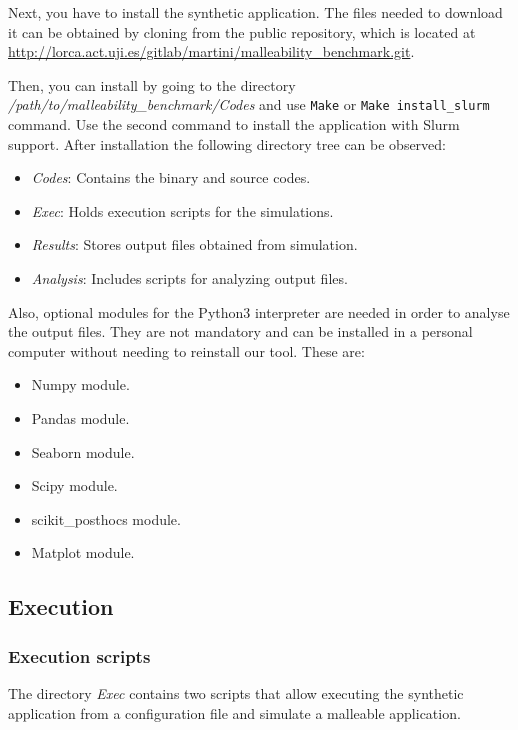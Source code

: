 Next, you have to install the synthetic application. 
The files needed to  download it can be obtained  by cloning from the public repository, which is located at \url{http://lorca.act.uji.es/gitlab/martini/malleability_benchmark.git}.

Then, you can install by going to the directory \textit{/path/to/malleability\_benchmark/Codes} and use \texttt{Make} or \texttt{Make install\_slurm} command. Use the second command to install the application with Slurm support.
After installation the following directory tree can be observed: %
\begin{itemize}
    \item \textit{Codes}: Contains the binary and source codes.
    \item \textit{Exec}: Holds execution scripts for the simulations.
    \item \textit{Results}: Stores output files obtained from simulation.
    \item \textit{Analysis}: Includes scripts for analyzing output files.
\end{itemize}

Also, optional modules for the Python3 interpreter are needed in order to analyse the output files. They are not mandatory and can be installed in a personal computer without needing to reinstall our tool. These are:
\begin{itemize}
    \item Numpy module.
    \item Pandas module.
    \item Seaborn module.
    \item Scipy module.
    \item scikit\_posthocs module.
    \item Matplot module.
\end{itemize}

\subsection{Execution}
\label{subsection:execution}
\subsubsection{Execution scripts}
The directory \textit{Exec} contains two scripts that allow executing the synthetic application from a configuration file and simulate a malleable application. %

